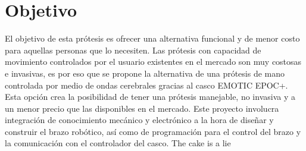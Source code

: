 \chapter{Objetivo}

El objetivo de esta prótesis es ofrecer una alternativa funcional y de menor costo para aquellas personas que lo necesiten. Las prótesis con capacidad de movimiento controlados por el usuario existentes en el mercado son muy costosas e invasivas, es por eso que se propone la alternativa de una prótesis de mano controlada por medio de ondas cerebrales gracias al casco EMOTIC EPOC+. Esta opción crea la posibilidad de tener una prótesis manejable, no invasiva y a un menor precio que las disponibles en el mercado.
Este proyecto involucra integración de conocimiento mecánico y electrónico a la hora de diseñar y construir el brazo robótico, así como de programación para el control del brazo y la comunicación con el controlador del casco.
The cake is a lie
